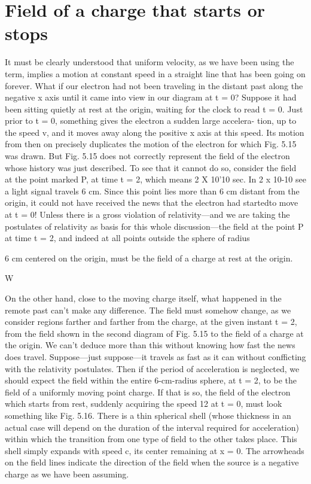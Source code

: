 \iffalse

\section{Field of a charge that starts or stops}

It must be clearly understood that uniform velocity, as we have
been using the term, implies a motion at constant speed in a straight
line that has been going on forever. What if our electron had not
been traveling in the distant past along the negative x axis until it
came into view in our diagram at t = 0? Suppose it had been sitting
quietly at rest at the origin, waiting for the clock to read t = 0. Just
prior to t = 0, something gives the electron a sudden large accelera-
tion, up to the speed v, and it moves away along the positive x axis
at this speed. Its motion from then on precisely duplicates the motion
of the electron for which Fig. 5.15 was drawn. But Fig. 5.15
does not correctly represent the field of the electron whose history
was just described. To see that it cannot do so, consider the field at
the point marked P, at time t = 2, which means 2 X 10'10 sec. In
2 x 10-10 see a light signal travels 6 cm. Since this point lies more
than 6 cm distant from the origin, it could not have received the news
that the electron had startedto move at t = 0! Unless there is a
gross violation of relativity---and we are taking the postulates of
relativity as basis for this whole discussion---the field at the point P
at time t = 2, and indeed at all points outside the sphere of radius

6 cm centered on the origin, must be the field of a charge at rest at the
origin.


 

W

On the other hand, close to the moving charge itself, what happened
in the remote past can't make any difference. The field must
somehow change, as we consider regions farther and farther from
the charge, at the given instant t = 2, from the field shown in the
second diagram of Fig. 5.15 to the field of a charge at the origin. We
can't deduce more than this without knowing how fast the news does
travel. Suppose---just suppose---it travels as fast as it can without
confficting with the relativity postulates. Then if the period of acceleration
is neglected, we should expect the field within the entire
6-cm-radius sphere, at t = 2, to be the field of a uniformly moving
point charge. If that is so, the field of the electron which starts from
rest, suddenly acquiring the speed 12 at t = 0, must look something
like Fig. 5.16. There is a thin spherical shell (whose thickness in an
actual case will depend on the duration of the interval required for
acceleration) within which the transition from one type of field to
the other takes place. This shell simply expands with speed c, its
center remaining at x = 0. The arrowheads on the field lines indicate
the direction of the field when the source is a negative charge
as we have been assuming.

